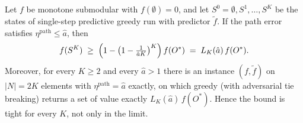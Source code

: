 
\begin{theorem}\label{thm:trajectory}
Let $f$ be monotone submodular with $f(\emptyset)=0$, and let
$S^0=\emptyset,S^1,\dots,S^K$ be the states of single-step predictive greedy run
with predictor $\tilde f$. If the path error satisfies
$\eta^{\mathrm{path}} \le \hat a$, then
\[
  f(S^K) \;\ge\; \Bigl(1-\bigl(1-\tfrac{1}{\hat a K}\bigr)^{K}\Bigr)\, f(O^\ast)
  \;=\; L_K(\hat a)\, f(O^\ast).
\]
Moreover, for every $K\ge 2$ and every $\hat a>1$ there is an instance
$(f,\tilde f)$ on $|N|=2K$ elements with $\eta^{\mathrm{path}}=\hat a$ exactly,
on which greedy (with adversarial tie breaking) returns a set of value exactly
$L_K(\hat a)\, f(O^\ast)$. Hence the bound is tight for every $K$, not only in
the limit.
\end{theorem}


